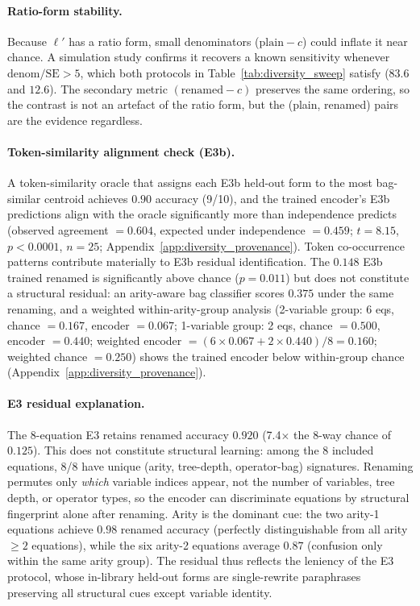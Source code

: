 \paragraph{Ratio-form stability.} Because $\ell'$ has a ratio form, small denominators ($\text{plain} - c$) could inflate it near chance. A simulation study confirms it recovers a known sensitivity whenever denom$/\text{SE} > 5$, which both protocols in Table~\ref{tab:diversity_sweep} satisfy ($83.6$ and $12.6$). The secondary metric $(\text{renamed} - c)$ preserves the same ordering, so the contrast is not an artefact of the ratio form, but the (plain, renamed) pairs are the evidence regardless.

\paragraph{Token-similarity alignment check (E3b).} A token-similarity oracle that assigns each E3b held-out form to the most bag-similar centroid achieves $0.90$ accuracy (9/10), and the trained encoder's E3b predictions align with the oracle significantly more than independence predicts (observed agreement $= 0.604$, expected under independence $= 0.459$; $t{=}8.15$, $p{<}0.0001$, $n{=}25$; Appendix~\ref{app:diversity_provenance}). Token co-occurrence patterns contribute materially to E3b residual identification. The $0.148$ E3b trained renamed is significantly above chance ($p{=}0.011$) but does not constitute a structural residual: an arity-aware bag classifier scores $0.375$ under the same renaming, and a weighted within-arity-group analysis (2-variable group: 6 eqs, chance $= 0.167$, encoder $= 0.067$; 1-variable group: 2 eqs, chance $= 0.500$, encoder $= 0.440$; weighted encoder $= (6{\times}0.067 + 2{\times}0.440)/8 = 0.160$; weighted chance $= 0.250$) shows the trained encoder below within-group chance (Appendix~\ref{app:diversity_provenance}).

\paragraph{E3 residual explanation.} The 8-equation E3 retains renamed accuracy $0.920$ (7.4$\times$ the 8-way chance of $0.125$).  This does not constitute structural learning: among the 8 included equations, 8/8 have unique (arity, tree-depth, operator-bag) signatures.  Renaming permutes only \emph{which} variable indices appear, not the number of variables, tree depth, or operator types, so the encoder can discriminate equations by structural fingerprint alone after renaming.  Arity is the dominant cue: the two arity-1 equations achieve $0.98$ renamed accuracy (perfectly distinguishable from all arity${\geq}2$ equations), while the six arity-2 equations average $0.87$ (confusion only within the same arity group).  The residual thus reflects the leniency of the E3 protocol, whose in-library held-out forms are single-rewrite paraphrases preserving all structural cues except variable identity.

